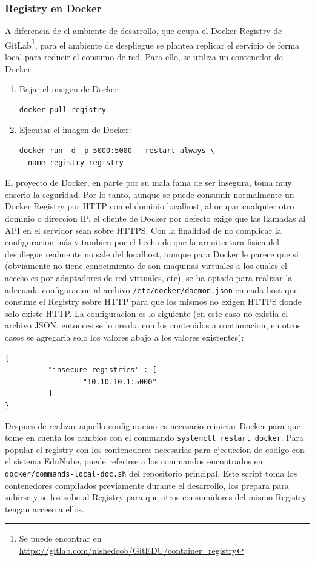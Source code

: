 \subsubsection{Registry en Docker}
A diferencia de el ambiente de desarrollo, que ocupa el Docker Registry de GitLab\footnote{Se puede encontrar en \url{https://gitlab.com/nishedcob/GitEDU/container\_registry}}, para el ambiente de despliegue se plantea replicar el servicio de forma local para reducir el consumo de red. Para ello, se utiliza un contenedor de Docker:
\begin{enumerate}
	\item Bajar el imagen de Docker:
    \begin{lstlisting}
docker pull registry
    \end{lstlisting}
    \item Ejecutar el imagen de Docker:
    \begin{lstlisting}
docker run -d -p 5000:5000 --restart always \
--name registry registry
    \end{lstlisting}
\end{enumerate}
El proyecto de Docker, en parte por su mala fama de ser insegura, toma muy enserio la seguridad. Por lo tanto, aunque se puede consumir normalmente un Docker Registry por HTTP con el dominio localhost, al ocupar cualquier otro dominio o direccion IP, el cliente de Docker por defecto exige que las llamadas al API en el servidor sean sobre HTTPS. Con la finalidad de no complicar la configuracion más y tambien por el hecho de que la arquitectura fisica del despliegue realmente no sale del localhost, aunque para Docker le parece que si (obviamente no tiene conocimiento de son maquinas virtuales a los cuales el acceso es por adaptadores de red virtuales, etc), se ha optado para realizar la adecuada configuracion al archivo \texttt{/etc/docker/daemon.json} en cada host que consume el Registry sobre HTTP para que los mismos no exigen HTTPS donde solo existe HTTP. La configuracion es lo siguiente (en este caso no existia el archivo JSON, entonces se lo creaba con los contenidos a continuacion, en otros casos se agregaria solo los valores abajo a los valores existentes):
\begin{lstlisting}
{
          "insecure-registries" : [
                  "10.10.10.1:5000"
          ]
}
\end{lstlisting}
Despues de realizar aquello configuracion es necesario reiniciar Docker  para que tome en cuenta los cambios con el commando \texttt{systemctl restart docker}. Para popular el registry con los contenedores necesarias para ejecuccion de codigo con el sistema EduNube, puede referirse a los commandos encontrados en \\
\texttt{docker/commands-local-doc.sh} del repositorio principal. Este script toma los contenedores compilados previamente durante el desarrollo, los prepara para subirse y se los sube al Registry para que otros consumidores del mismo Registry tengan acceso a ellos.

